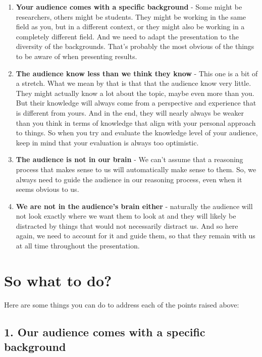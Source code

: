 \documentclass[
]{book}
\begin{document}
\begin{enumerate}
\def\labelenumi{\arabic{enumi}.}
\item
  \textbf{Your audience comes with a specific background} - Some might be researchers, others might be students. They might be working in the same field as you, but in a different context, or they might also be working in a completely different field. And we need to adapt the presentation to the diversity of the backgrounds. That's probably the most obvious of the things to be aware of when presenting results.
\item
  \textbf{The audience know less than we think they know} - This one is a bit of a stretch. What we mean by that is that that the audience know very little. They might actually know a lot about the topic, maybe even more than you. But their knowledge will always come from a perspective and experience that is different from yours. And in the end, they will nearly always be weaker than you think in terms of knowledge that align with your personal approach to things. So when you try and evaluate the knowledge level of your audience, keep in mind that your evaluation is always too optimistic.
\item
  \textbf{The audience is not in our brain} - We can't assume that a reasoning process that makes sense to us will automatically make sense to them. So, we always need to guide the audience in our reasoning process, even when it seems obvious to us.
\item
  \textbf{We are not in the audience's brain either} - naturally the audience will not look exactly where we want them to look at and they will likely be distracted by things that would not necessarily distract us. And so here again, we need to account for it and guide them, so that they remain with us at all time throughout the presentation.
\end{enumerate}

\hypertarget{so-what-to-do}{%
\section{So what to do?}\label{so-what-to-do}}

Here are some things you can do to address each of the points raised above:

\hypertarget{our-audience-comes-with-a-specific-background}{%
\subsection{1. Our audience comes with a specific background}\label{our-audience-comes-with-a-specific-background}}
\end{document}
